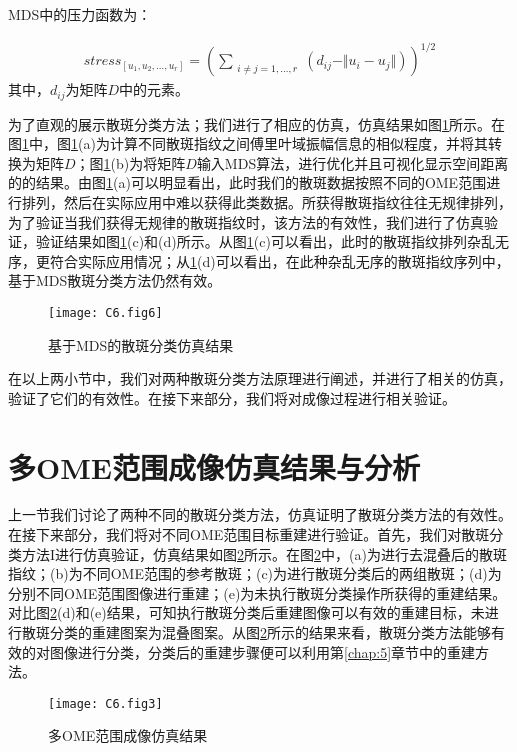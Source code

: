MDS中的压力函数为：

\begin{equation}
\begin{aligned}
stress_{[u_1,u_2,\ldots, u_r]} =\left( \sum_{\substack{i\neq j = 1,\ldots,r} } (d_{ij}-\Vert u_{i}- u_{j} \Vert ) \right)^{1/2}
\label{eq:6.7}
\end{aligned}
\end{equation}
其中，$d_{ij}$为矩阵$D$中的元素。

为了直观的展示散斑分类方法；我们进行了相应的仿真，仿真结果如图\ref{fig:6.6}所示。在图\ref{fig:6.6}中，图\ref{fig:6.6}(a)为计算不同散斑指纹之间傅里叶域振幅信息的相似程度，并将其转换为矩阵$D$；图\ref{fig:6.6}(b)为将矩阵$D$输入MDS算法，进行优化并且可视化显示空间距离的的结果。由图\ref{fig:6.6}(a)可以明显看出，此时我们的散斑数据按照不同的OME范围进行排列，然后在实际应用中难以获得此类数据。所获得散斑指纹往往无规律排列，为了验证当我们获得无规律的散斑指纹时，该方法的有效性，我们进行了仿真验证，验证结果如图\ref{fig:6.6}(c)和(d)所示。从图\ref{fig:6.6}(c)可以看出，此时的散斑指纹排列杂乱无序，更符合实际应用情况；从\ref{fig:6.6}(d)可以看出，在此种杂乱无序的散斑指纹序列中，基于MDS散斑分类方法仍然有效。
\begin{figure}[htp]
	\centering
	\texttt{[image: C6.fig6]}
	\caption{基于MDS的散斑分类仿真结果}
	\label{fig:6.6}
\end{figure}

在以上两小节中，我们对两种散斑分类方法原理进行阐述，并进行了相关的仿真，验证了它们的有效性。在接下来部分，我们将对成像过程进行相关验证。

\section{多OME范围成像仿真结果与分析}

上一节我们讨论了两种不同的散斑分类方法，仿真证明了散斑分类方法的有效性。在接下来部分，我们将对不同OME范围目标重建进行验证。首先，我们对散斑分类方法I进行仿真验证，仿真结果如图\ref{fig:6.3}所示。在图\ref{fig:6.3}中，(a)为进行去混叠后的散斑指纹；(b)为不同OME范围的参考散斑；(c)为进行散斑分类后的两组散斑；(d)为分别不同OME范围图像进行重建；(e)为未执行散斑分类操作所获得的重建结果。对比图\ref{fig:6.3}(d)和(e)结果，可知执行散斑分类后重建图像可以有效的重建目标，未进行散斑分类的重建图案为混叠图案。从图\ref{fig:6.3}所示的结果来看，散斑分类方法能够有效的对图像进行分类，分类后的重建步骤便可以利用第\ref{chap:5}章节中的重建方法。

\begin{figure}[htp]
	\centering
	\texttt{[image: C6.fig3]}
	\caption{多OME范围成像仿真结果}
	\label{fig:6.3}
\end{figure}

